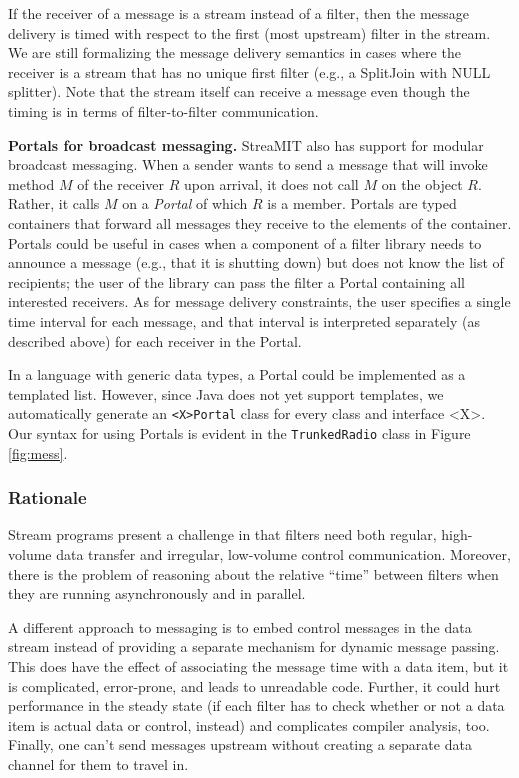 If the receiver of a message is a stream instead of a filter, then the
message delivery is timed with respect to the first (most upstream)
filter in the stream.  We are still formalizing the message delivery
semantics in cases where the receiver is a stream that has no unique
first filter (e.g., a SplitJoin with NULL splitter).  Note that the
stream itself can receive a message even though the timing is in terms
of filter-to-filter communication.

{\bf Portals for broadcast messaging.}  StreaMIT also has support for
modular broadcast messaging.  When a sender wants to send a message
that will invoke method $M$ of the receiver $R$ upon arrival, it does
not call $M$ on the object $R$.  Rather, it calls $M$ on a {\it
Portal} of which $R$ is a member.  Portals are typed containers that
forward all messages they receive to the elements of the container.
Portals could be useful in cases when a component of a filter library
needs to announce a message (e.g., that it is shutting down) but does
not know the list of recipients; the user of the library can pass the
filter a Portal containing all interested receivers.  As for message
delivery constraints, the user specifies a single time interval for
each message, and that interval is interpreted separately (as
described above) for each receiver in the Portal.

In a language with generic data types, a Portal could be implemented
as a templated list.  However, since Java does not yet support
templates, we automatically generate an {\tt <X>Portal} class for
every class and interface <X>.  Our syntax for using Portals is
evident in the {\tt TrunkedRadio} class in Figure
\ref{fig:mess}.

\subsubsection{Rationale}

Stream programs present a challenge in that filters need both regular,
high-volume data transfer and irregular, low-volume control
communication.  Moreover, there is the problem of reasoning about the
relative ``time'' between filters when they are running asynchronously
and in parallel.

A different approach to messaging is to embed control messages in the
data stream instead of providing a separate mechanism for dynamic
message passing.  This does have the effect of associating the message
time with a data item, but it is complicated, error-prone, and leads
to unreadable code.  Further, it could hurt performance in the steady
state (if each filter has to check whether or not a data item is
actual data or control, instead) and complicates compiler analysis,
too.  Finally, one can't send messages upstream without creating a
separate data channel for them to travel in.

